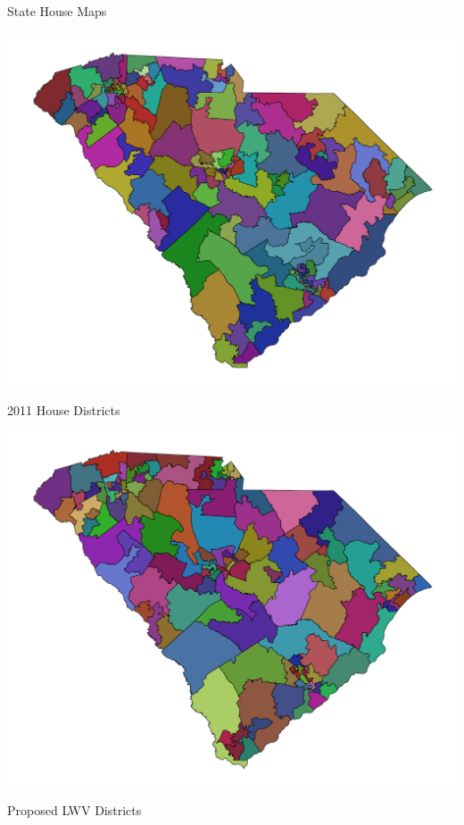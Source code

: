 \documentclass[xcolor=dvipsnames,table]{beamer}
\theoremstyle{plain}
\theoremstyle{definition}
\begin{document}
\begin{frame}{State House Maps}
\begin{minipage}{0.5\textwidth}
\hspace{-9mm}\includegraphics[scale=0.26]{House2011.pdf}

\hspace{5mm} 2011 House Districts
\end{minipage}%
\begin{minipage}{0.5\textwidth}
\hspace{-8mm} \includegraphics[scale=0.26]{House2021.pdf}


\hspace{8mm} Proposed LWV Districts
\end{minipage}
\end{frame}
\end{document}
